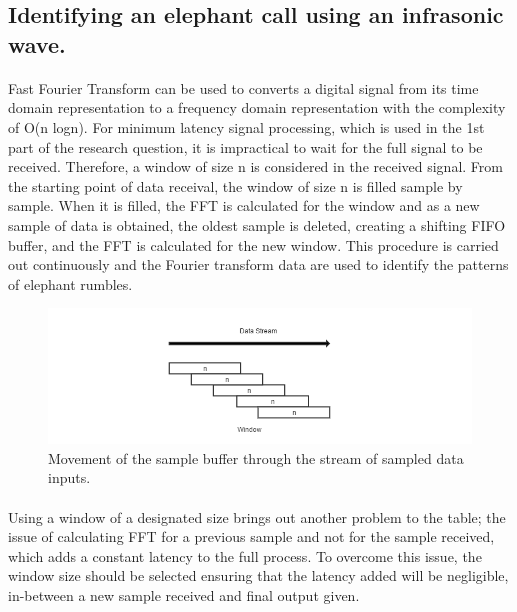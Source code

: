 \documentclass[11pt]{article}
\numberwithin{figure}{section}
\numberwithin{table}{section}
\begin{document}
\subsection{Identifying an elephant call using an infrasonic wave.}
\paragraph{}
Fast Fourier Transform can be used to converts a digital signal from its time domain representation to a frequency domain representation with the complexity of O(n logn). For minimum latency signal processing, which is used in the 1st part of the research question, it is impractical to wait for the full signal to be received. Therefore, a window of size n is considered in the received signal. From the starting point of data receival, the window of size n is filled sample by sample. When it is filled, the FFT is calculated for the window and as a new sample of data is obtained, the oldest sample is deleted, creating a shifting FIFO buffer, and the FFT is calculated for the new window. This procedure is carried out continuously and the Fourier transform data are used to identify the patterns of elephant rumbles.

\begin{figure}[h]
\centering
\includegraphics[width= \textwidth]{b.png}
\caption{Movement of the sample buffer through the stream of sampled data inputs.}
\label{b:logo}
\end{figure}

\paragraph{}
Using a window of a designated size brings out another problem to the table; the issue of calculating FFT for a previous sample and not for the sample received, which adds a constant latency to the full process. To overcome this issue, the window size should be selected ensuring that the latency added will be negligible, in-between a new sample received and final output given.
\end{document}
